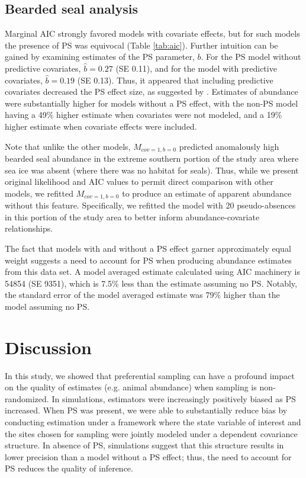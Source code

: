 \documentclass[times,mee,doublespace,]{besauth2}
\begin{document}
\subsection{Bearded seal analysis}

Marginal AIC strongly favored models with covariate effects, but for such models the presence of PS was equivocal (Table \ref{tab:aic}).  Further intuition can be gained by examining estimates of the PS parameter, $b$.  For the PS model without predictive covariates,  $\hat{b}=0.27$ (SE 0.11), and for the model with predictive covariates, $\hat{b}=0.19$ (SE 0.13).  Thus, it appeared that including predictive covariates decreased the PS effect size, as suggested by \citet{PatiEtAl2011}.  Estimates of abundance were substantially higher for models without a PS effect, with the non-PS model having a 49\% higher estimate when covariates were not modeled, and a 19\% higher estimate when covariate effects were included.

Note that unlike the other models, $M_{cov=1,b=0}$ predicted anomalously high bearded seal abundance in the extreme southern portion of the study area where sea ice was absent (where there was no habitat for seals).  Thus, while we present original likelihood and AIC values to permit direct comparison with other models, we refitted $M_{cov=1,b=0}$ to produce an estimate of apparent abundance without this feature. Specifically, we refitted the model with 20 pseudo-absences in this portion of the study area to better inform abundance-covariate relationships.

The fact that models with and without a PS effect garner approximately equal weight suggests a need to account for PS when producing abundance estimates from this data set.  A model averaged estimate calculated using AIC machinery \citep{BurnhamAnderson2002} is 54854 (SE 9351), which is 7.5\% less than the estimate assuming no PS.  Notably, the standard error of the model averaged estimate was 79\% higher than the model assuming no PS.

\section{Discussion}


In this study, we showed that preferential sampling can have a profound impact on the quality of estimates (e.g. animal abundance) when sampling is non-randomized. In simulations, estimators were increasingly positively biased as PS increased. When PS was present, we were able to substantially reduce bias by conducting estimation under a framework where the state variable of interest and the sites chosen for sampling were jointly modeled under a dependent covariance structure.  In absence of PS, simulations suggest that this structure results in lower precision than a model without a PS effect; thus, the need to account for PS reduces the quality of inference.
\end{document}
